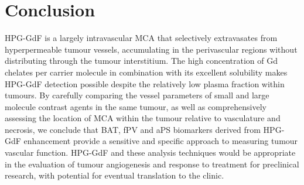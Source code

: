 \section{Conclusion}

HPG-GdF is a largely intravascular MCA that selectively extravasates from hyperpermeable tumour vessels, accumulating in the perivascular regions without distributing through the tumour interstitium.
The high concentration of Gd chelates per carrier molecule in combination with its excellent solubility makes HPG-GdF detection possible despite the relatively low plasma fraction within tumours.
By carefully comparing the vessel parameters of small and large molecule contrast agents in the same tumour, as well as comprehensively assessing the location of MCA within the tumour relative to vasculature and necrosis, we conclude that BAT, fPV and aPS biomarkers derived from HPG-GdF enhancement provide a sensitive and specific approach to measuring tumour vascular function.
HPG-GdF and these analysis techniques would be appropriate in the evaluation of tumour angiogenesis and response to treatment for preclinical research, with potential for eventual translation to the clinic.


\endinput
